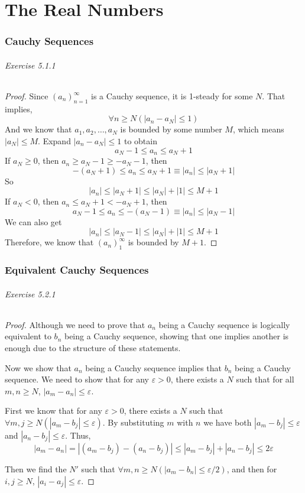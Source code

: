 \part{The Real Numbers}

\section{Cauchy Sequences}
\paragraph{Exercise 5.1.1} \label{exercise5.1.1}
\begin{proof}
Since $(a_n)^\infty_{n=1}$ is a Cauchy sequence, it is 1-steady for some $N$. That implies,
\[
\forall n \geq N(|a_n-a_N| \leq 1)
\]
And we know that $a_1,a_2,\dots,a_N$ is bounded by some number $M$, which means $|a_N| \leq M$. Expand $|a_n-a_N| \leq 1$ to obtain 
\[
a_N-1 \leq a_n \leq a_N+1
\]
If $a_N \geq 0$, then $a_n \geq a_N-1 \geq -a_N-1$, then 
\[
-(a_N+1) \leq a_n \leq a_N+1 \equiv |a_n| \leq |a_N+1|
\]
So 
\[
|a_n| \leq |a_N+1| \leq |a_N| + |1| \leq M+1
\]
If $a_N < 0$, then $a_n \leq a_N +1 < -a_N+1$, then
\[
a_N - 1 \leq a_n \leq -(a_N-1) \equiv |a_n| \leq |a_N-1|
\]
We can also get 
\[
|a_n| \leq |a_N-1| \leq |a_N| + |1| \leq M+1
\]
Therefore, we know that $(a_n)^\infty_1$ is bounded by $M+1$.
\end{proof}

\section{Equivalent Cauchy Sequences}
\paragraph{Exercise 5.2.1} \label{exercise5.2.1}
\begin{proof}
Although we need to prove that $a_n$ being a Cauchy sequence is logically equivalent to $b_n$ being a Cauchy sequence, showing that one 
implies another is enough due to the structure of these statements.

Now we show that $a_n$ being a Cauchy sequence implies that $b_n$ being a Cauchy sequence. We need to show that for any $\varepsilon >0$, 
there exists a $N$ such that for all $m,n\geq N$, $|a_m-a_n| \leq \varepsilon$. 

First we know that for any $\varepsilon >0$, there exists a $N$ such that $\forall m,j\geq N(|a_m-b_j|\leq \varepsilon)$. By substituting $m$ 
with $n$ we have both $|a_m-b_j|\leq \varepsilon$ and $|a_n-b_j|\leq \varepsilon$.
Thus, 
\[
|a_m-a_n| = |(a_m-b_j) - (a_n-b_j)| \leq |a_m-b_j| + |a_n-b_j| \leq 2\varepsilon
\]

Then we find the $N'$ such that $\forall m,n\geq N(|a_m-b_n| \leq \varepsilon/2)$, and then for $i,j \geq N$, $|a_i-a_j| \leq \varepsilon$.
\end{proof}

